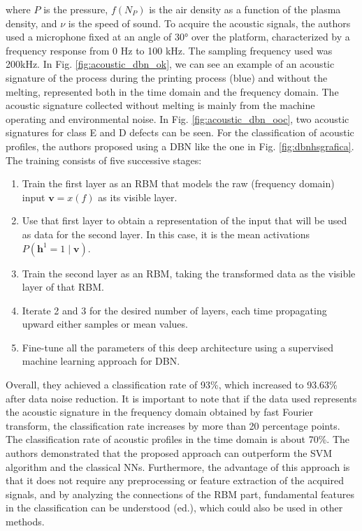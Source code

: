 where $P$ is the pressure, $f(N_P)$ is the air density as a function of the plasma density, and $\nu$ is the speed of sound. To acquire the acoustic signals, the authors used a microphone fixed at an angle of 30° over the platform, characterized by a frequency response from 0 Hz to 100 kHz. The sampling frequency used was 200kHz. In Fig. \ref{fig:acoustic_dbn_ok}, we can see an example of an acoustic signature of the process during the printing process (blue) and without the melting, represented both in the time domain and the frequency domain. The acoustic signature collected without melting is mainly from the machine operating and environmental noise. In Fig. \ref{fig:acoustic_dbn_ooc}, two acoustic signatures for class E and D defects can be seen. For the classification of acoustic profiles, the authors proposed using a DBN like the one in Fig. \ref{fig:dbnhsgrafica}. The training consists of five successive stages:
\begin{enumerate}
\item Train the first layer as an RBM that models the raw (frequency domain) input $\mathbf{v}=x(f)$ as its visible layer. 
\item Use that first layer to obtain a representation of the input that will be used as data for the second layer. In this case, it is the mean activations $P(\mathbf{h}^1 =1\mid\mathbf{v})$.
\item Train the second layer as an RBM, taking the transformed data as the visible layer of that RBM. 
\item Iterate 2 and 3 for the desired number of layers, each time propagating upward either samples or mean values. 
\item Fine-tune all the parameters of this deep architecture using a supervised machine learning approach for DBN.
\end{enumerate}
Overall, they achieved a classification rate of 93\%, which increased to 93.63\% after data noise reduction. It is important to note that if the data used represents the acoustic signature in the frequency domain obtained by fast Fourier transform, the classification rate increases by more than 20 percentage points. The classification rate of acoustic profiles in the time domain is about 70\%. The authors demonstrated that the proposed approach can outperform the SVM algorithm and the classical NNs. Furthermore, the advantage of this approach is that it does not require any preprocessing or feature extraction of the acquired signals, and by analyzing the connections of the RBM part, fundamental features in the classification can be understood (ed.), which could also be used in other methods.

